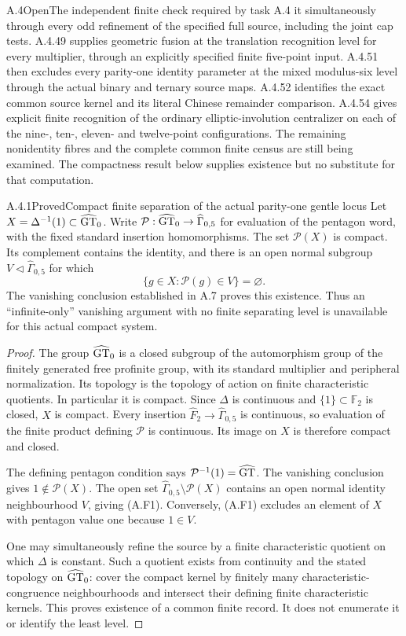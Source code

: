 \begin{result}{A.4}{Open}{The independent finite check required by task A.4}
it simultaneously through every odd refinement of the
specified full source, including the joint cap tests.
A.4.49 supplies geometric fusion at the translation
recognition level for every multiplier, through an explicitly
specified finite five-point input. A.4.51 then excludes every parity-one identity parameter
at the mixed modulus-six level through the actual binary
and ternary source maps. A.4.52 identifies the exact
common source kernel and its literal Chinese remainder
comparison. A.4.54 gives explicit finite recognition of
the ordinary elliptic-involution centralizer on each of
the nine-, ten-, eleven- and twelve-point configurations.
 The remaining nonidentity fibres
and the complete common finite census are still being
examined. The compactness result below supplies existence
but no substitute for that computation.
\end{result}

\begin{result}{A.4.1}{Proved}{Compact finite separation of the actual parity-one gentle locus}
Let $X=\Delta^{-1}(1)\subset\widehat{\mathrm{GT}}_0$. Write
$\mathcal P:\widehat{\mathrm{GT}}_0\to\widehat\Gamma_{0,5}$ for evaluation of the pentagon word, with the fixed standard insertion homomorphisms. The set $\mathcal P(X)$ is compact. Its complement contains the identity, and there is an open normal subgroup $V\triangleleft\widehat\Gamma_{0,5}$ for which
\[
 \{g\in X:\mathcal P(g)\in V\}=\varnothing.
 \tag{A.F1}
\]
The vanishing conclusion established in A.7 proves this existence. Thus an ``infinite-only'' vanishing argument with no finite separating level is unavailable for this actual compact system.
\end{result}
\begin{proof}
The group $\widehat{\mathrm{GT}}_0$ is a closed subgroup of the automorphism group of the finitely generated free profinite group, with its standard multiplier and peripheral normalization. Its topology is the topology of action on finite characteristic quotients. In particular it is compact. Since $\Delta$ is continuous and $\{1\}\subset\mathbb F_2$ is closed, $X$ is compact. Every insertion $\widehat F_2\to\widehat\Gamma_{0,5}$ is continuous, so evaluation of the finite product defining $\mathcal P$ is continuous. Its image on $X$ is therefore compact and closed.

The defining pentagon condition says $\mathcal P^{-1}(1)=\widehat{\mathrm{GT}}$. The vanishing conclusion gives $1\notin\mathcal P(X)$. The open set $\widehat\Gamma_{0,5}\setminus\mathcal P(X)$ contains an open normal identity neighbourhood $V$, giving (A.F1). Conversely, (A.F1) excludes an element of $X$ with pentagon value one because $1\in V$.

One may simultaneously refine the source by a finite characteristic quotient on which $\Delta$ is constant. Such a quotient exists from continuity and the stated topology on $\widehat{\mathrm{GT}}_0$: cover the compact kernel by finitely many characteristic-congruence neighbourhoods and intersect their defining finite characteristic kernels. This proves existence of a common finite record. It does not enumerate it or identify the least level.
\end{proof}

